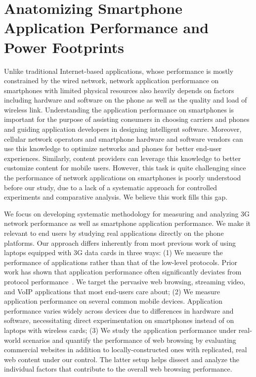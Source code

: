 \chapter{Anatomizing Smartphone Application Performance and Power Footprints} \label{chap:app}

Unlike traditional Internet-based applications, whose performance is mostly constrained by the wired network, network application performance on smartphones with limited physical resources also heavily depends on factors including hardware and software on the 
phone as well as the quality and load of wireless link. Understanding 
the application performance on smartphones is important for the 
purpose of assisting consumers in choosing carriers and phones and 
guiding application developers in designing intelligent software. 
Moreover, cellular network operators and smartphone hardware and 
software vendors can use this knowledge to optimize networks and 
phones for better end-user experiences. Similarly, content providers 
can leverage this knowledge to better customize content for mobile 
users. However, this task is quite challenging since the performance 
of network applications on smartphones is poorly understood before our study, due to a lack of a systematic approach for controlled experiments 
and comparative analysis. We believe this work fills this gap.

We focus on developing systematic methodology for measuring and
analyzing 3G network performance as well as smartphone application
performance. We make it relevant to end users by studying real
applications directly on the phone platforms. Our approach differs 
inherently from most previous work of using laptops equipped with 
3G data cards in three ways: (1) We measure the performance of 
applications rather than that of the low-level protocols. Prior 
work has shown that application performance often significantly 
deviates from protocol performance~\cite{Zhuang:A3:Mobicom2006}. 
We target the pervasive web browsing, streaming video, and VoIP
applications that most end-users care about; (2) We measure 
application performance on several common mobile devices. 
Application performance varies widely across devices due to 
differences in hardware and software, necessitating direct 
experimentation on smartphones instead of on laptops with wireless 
cards; (3) We study the application performance under real-world 
scenarios and quantify the performance of web browsing by 
evaluating commercial websites in addition to locally-constructed 
ones with replicated, real web content under our control. The 
latter setup helps dissect and analyze the individual factors 
that contribute to the overall web browsing performance.


